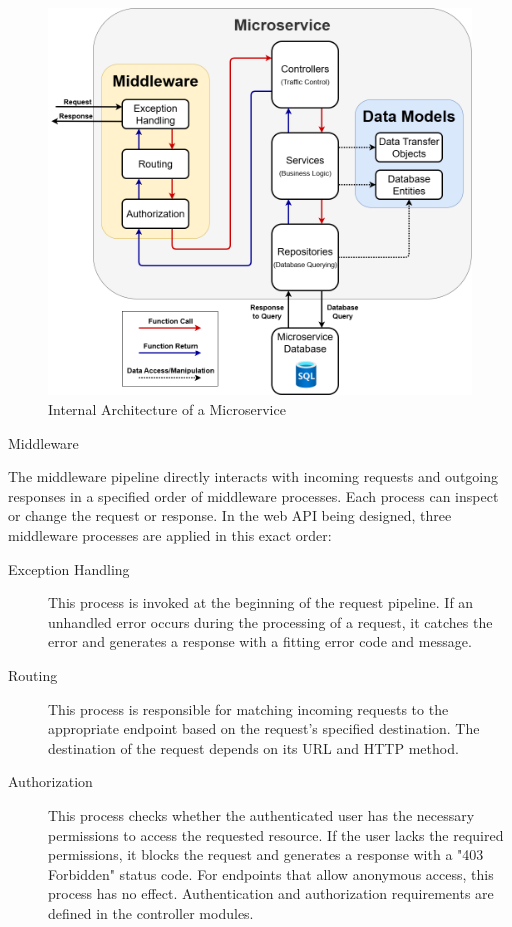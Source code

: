 \documentclass[12pt, reqno, oneside]{amsbook}
\makeatletter
\def\subsection{\@startsection{subsection}{2}%
      \z@{.5\linespacing\@plus.7\linespacing}{.25\linespacing}%
      {\normalfont\bfseries\flushleft}}
\theoremstyle{definition}
\theoremstyle{definition}
\numberwithin{section}{chapter}
\numberwithin{table}{chapter}
\numberwithin{figure}{chapter}
\makeatother
\begin{document}
\begin{figure}[H]
  \centering
  \includegraphics[width=1\linewidth]{images/InternalMicroserviceArchitecture.png}
  \caption{\label{Figure:InternalMicroserviceArchitecture}Internal Architecture of a Microservice}
\end{figure}

\pagebreak

\subsection{Middleware}
\label{Subsection:Middleware}

The middleware pipeline directly interacts with incoming requests and outgoing responses in a specified order of middleware processes. Each process can inspect or change the request or response. In the web \ac{API} being designed, three middleware processes are applied in this exact order:

\begin{description}
  \item[Exception Handling] This process is invoked at the beginning of the request pipeline. If an unhandled error occurs during the processing of a request, it catches the error and generates a response with a fitting error code and message.
  \item[Routing] This process is responsible for matching incoming requests to the appropriate endpoint based on the request's specified destination. The destination of the request depends on its \Ac{URL} and \ac{HTTP} method.
  \item[Authorization] This process checks whether the authenticated user has the necessary permissions to access the requested resource. If the user lacks the required permissions, it blocks the request and generates a response with a "403 Forbidden" status code. For endpoints that allow anonymous access, this process has no effect. Authentication and authorization requirements are defined in the controller modules.
\end{description}
\end{document}
